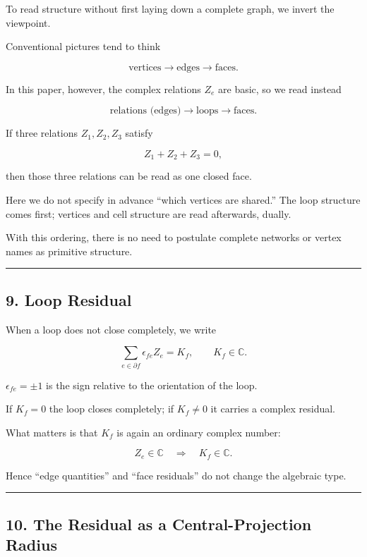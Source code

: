 \documentclass[
  a4paper,
]{article}
\begin{document}
To read structure without first laying down a complete graph, we invert
the viewpoint.

Conventional pictures tend to think

\[
\text{vertices}\to\text{edges}\to\text{faces}.
\]

In this paper, however, the complex relations \(Z_e\) are basic, so we
read instead

\[
\boxed{\text{relations (edges)}\to\text{loops}\to\text{faces}}.
\]

If three relations \(Z_1,Z_2,Z_3\) satisfy

\[
Z_1+Z_2+Z_3=0,
\]

then those three relations can be read as one closed face.

Here we do not specify in advance ``which vertices are shared.'' The
loop structure comes first; vertices and cell structure are read
afterwards, dually.

With this ordering, there is no need to postulate complete networks or
vertex names as primitive structure.

\begin{center}\rule{0.5\linewidth}{0.5pt}\end{center}

\subsection{9. Loop Residual}\label{loop-residual}

When a loop does not close completely, we write

\[
\boxed{\sum_{e\in\partial f}\epsilon_{fe}Z_e=K_f},\qquad K_f\in\mathbb C.
\]

\(\epsilon_{fe}=\pm1\) is the sign relative to the orientation of the
loop.

If \(K_f=0\) the loop closes completely; if \(K_f\neq0\) it carries a
complex residual.

What matters is that \(K_f\) is again an ordinary complex number:

\[
\boxed{Z_e\in\mathbb C\quad\Rightarrow\quad K_f\in\mathbb C}.
\]

Hence ``edge quantities'' and ``face residuals'' do not change the
algebraic type.

\begin{center}\rule{0.5\linewidth}{0.5pt}\end{center}

\subsection{10. The Residual as a Central-Projection
Radius}\label{the-residual-as-a-central-projection-radius}
\end{document}
